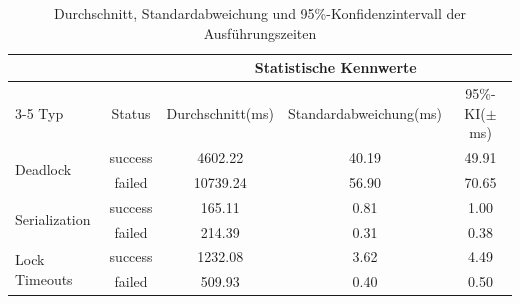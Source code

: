 
\begin{table}[htbp]
	\centering
	\smallsize
	\begin{tabular}{l|c|ccc}
		\toprule
		& & \multicolumn{3}{c}{Statistische Kennwerte} \\
		\cmidrule(lr){3-5}
		Typ & Status & Durchschnitt(ms) & Standardabweichung(ms) & 95\%-KI($\pm$ms)\\
		\midrule
		\multirow{2}{*}{Deadlock}
		& success & 4602.22 & 40.19 & 49.91 \\
		& failed & 10739.24 & 56.90 & 70.65 \\
		\midrule
		\multirow{2}{*}{Serialization}
		& success & 165.11 & 0.81 & 1.00 \\
		& failed & 214.39 & 0.31 & 0.38 \\
		\midrule
		\multirow{2}{*}{Lock Timeouts}
		& success & 1232.08 & 3.62 & 4.49 \\
		& failed & 509.93 & 0.40 & 0.50 \\
		\bottomrule
	\end{tabular}
	\caption{Durchschnitt, Standardabweichung und 95\%-Konfidenzintervall der Ausführungszeiten}
	\label{tab:statisticSubstantiation}
\end{table}